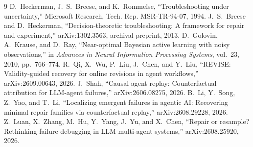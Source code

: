 \documentclass[10pt,letterpaper]{article}
\begin{document}
\begin{thebibliography}{9}
 D.~Heckerman, J.~S.~Breese, and K.~Rommelse, ``Troubleshooting under uncertainty,'' Microsoft Research, Tech. Rep. MSR-TR-94-07, 1994.
 J.~S.~Breese and D.~Heckerman, ``Decision-theoretic troubleshooting: A framework for repair and experiment,'' arXiv:1302.3563, archival preprint, 2013.
 D.~Golovin, A.~Krause, and D.~Ray, ``Near-optimal Bayesian active learning with noisy observations,'' in \emph{Advances in Neural Information Processing Systems}, vol.~23, 2010, pp.~766--774.
 R.~Qi, X.~Wu, P.~Liu, J.~Chen, and Y.~Liu, ``REVISE: Validity-guided recovery for online revisions in agent workflows,'' arXiv:2609.00643, 2026.
 J.~Shah, ``Causal agent replay: Counterfactual attribution for LLM-agent failures,'' arXiv:2606.08275, 2026.
 B.~Li, Y.~Song, Z.~Yao, and T.~Li, ``Localizing emergent failures in agentic AI: Recovering minimal repair families via counterfactual replay,'' arXiv:2608.29228, 2026.
 Z.~Luan, X.~Zhang, M.~Hu, Y.~Yang, J.~Yu, and X.~Chen, ``Repair or resample? Rethinking failure debugging in LLM multi-agent systems,'' arXiv:2608.25920, 2026.
\end{thebibliography}
\end{document}
